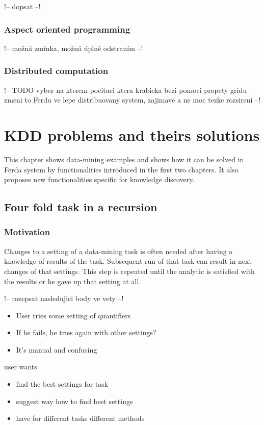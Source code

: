 \documentclass[a4paper,12pt]{book}
\begin{document}
!-- dopsat --!

\subsection{Aspect oriented programming}

!-- možná zmínka, možná úplně odstraním --!

\subsection{Distributed computation}
!-- TODO vyber na kterem pocitaci ktera krabicka bezi pomoci propety gridu -- zmeni to Ferdu ve lepe distribuovany system, zajimave a ne moc tezke rozsireni --!

\chapter{KDD problems and theirs solutions}
\label{chap:KDDExamples}
This chapter shows data-mining examples and shows how it can be solved in Ferda system by functionalities introduced in the first two chapters. It also proposes new functionalities specific for knowledge discovery.

\section{Four fold task in a recursion}
\subsection{Motivation}
Changes to a setting of a data-mining task is often needed after having a knowledge of results of the task. Subsequent run of that task can result in next changes of that settings. This step is repeated until the analytic is satisfied with the results or he gave up that setting at all.

!-- rozepsat nasledujici body ve vety --!

\begin{itemize}
			\item User tries some setting of quantifiers
			\item If he fails, he tries again with other settings?
			\item It's manual and confusing
\end{itemize}
		user wants
		\begin{itemize}
			\item find the best settings for task
			\item suggest way how to find best settings
			\item have for different tasks different methods
		\end{itemize}
\end{document}
